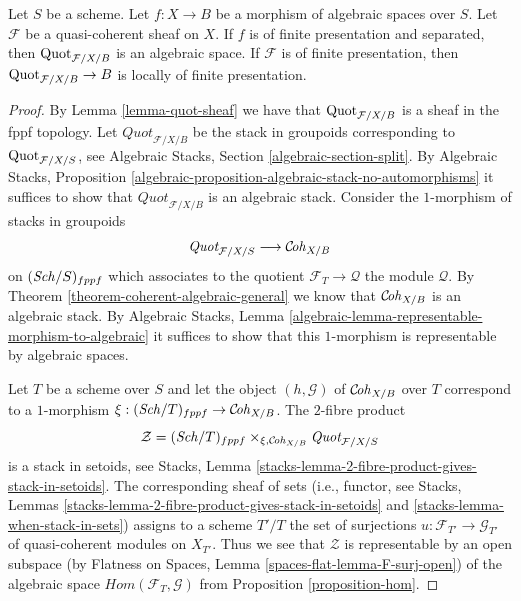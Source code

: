\begin{proposition}
\label{proposition-quot}
Let $S$ be a scheme. Let $f : X \to B$ be a morphism of algebraic
spaces over $S$. Let $\mathcal{F}$ be a quasi-coherent sheaf
on $X$. If $f$ is of finite presentation and separated, then
$\mathrm{Quot}_{\mathcal{F}/X/B}$
is an algebraic space. If $\mathcal{F}$ is of finite presentation,
then $\mathrm{Quot}_{\mathcal{F}/X/B} \to B$ is locally of finite presentation.
\end{proposition}

\begin{proof}
By Lemma \ref{lemma-quot-sheaf}
we have that $\mathrm{Quot}_{\mathcal{F}/X/B}$ is a sheaf in the
fppf topology. Let $\textit{Quot}_{\mathcal{F}/X/B}$ be the stack in
groupoids corresponding to $\mathrm{Quot}_{\mathcal{F}/X/S}$, see
Algebraic Stacks, Section \ref{algebraic-section-split}.
By Algebraic Stacks, Proposition
\ref{algebraic-proposition-algebraic-stack-no-automorphisms}
it suffices to show that $\textit{Quot}_{\mathcal{F}/X/B}$
is an algebraic stack.
Consider the $1$-morphism of stacks in groupoids
$$
\textit{Quot}_{\mathcal{F}/X/S}
\longrightarrow
\mathcal{C}\!\mathit{oh}_{X/B}
$$
on $(\mathit{Sch}/S)_{fppf}$ which associates to the quotient
$\mathcal{F}_T \to \mathcal{Q}$ the module $\mathcal{Q}$.
By Theorem \ref{theorem-coherent-algebraic-general} we know that
$\mathcal{C}\!\mathit{oh}_{X/B}$ is an algebraic stack.
By Algebraic Stacks, Lemma
\ref{algebraic-lemma-representable-morphism-to-algebraic}
it suffices to show that this $1$-morphism is representable
by algebraic spaces.

\medskip\noindent
Let $T$ be a scheme over $S$ and let the object $(h, \mathcal{G})$ of
$\mathcal{C}\!\mathit{oh}_{X/B}$ over $T$ correspond
to a $1$-morphism $\xi : (\mathit{Sch}/T)_{fppf} \to \mathcal{C}\!\mathit{oh}_{X/B}$.
The $2$-fibre product
$$
\mathcal{Z} =
(\mathit{Sch}/T)_{fppf}
\times_{\xi, \mathcal{C}\!\mathit{oh}_{X/B}}
\textit{Quot}_{\mathcal{F}/X/S}
$$
is a stack in setoids, see
Stacks, Lemma \ref{stacks-lemma-2-fibre-product-gives-stack-in-setoids}.
The corresponding sheaf of sets (i.e., functor, see
Stacks, Lemmas
\ref{stacks-lemma-2-fibre-product-gives-stack-in-setoids} and
\ref{stacks-lemma-when-stack-in-sets}) assigns to a scheme
$T'/T$ the set of surjections $u : \mathcal{F}_{T'} \to \mathcal{G}_{T'}$
of quasi-coherent modules on $X_{T'}$. Thus we see that
$\mathcal{Z}$ is representable by an open subspace
(by Flatness on Spaces, Lemma \ref{spaces-flat-lemma-F-surj-open})
of the algebraic space
$\mathit{Hom}(\mathcal{F}_T, \mathcal{G})$ from
Proposition \ref{proposition-hom}.
\end{proof}

